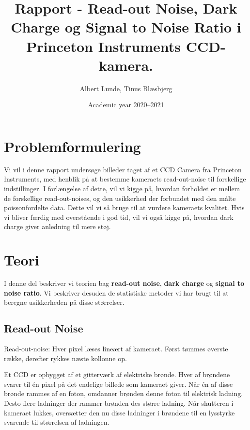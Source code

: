 \documentclass[working]{tuftebook}
\title{Rapport - Read-out Noise, Dark Charge og Signal to Noise Ratio i Princeton Instruments CCD-kamera.}
\author{Albert Lunde, Tinus Blæsbjerg}
\date{Academic year 2020--2021}
\begin{document}
\maketitle
\pagestyle{fancy}
\tableofcontents
\cleardoublepage
\chapter*{Problemformulering}
Vi vil i denne rapport undersøge billeder taget af et CCD Camera fra Princeton Instruments, med henblik på at bestemme kameraets read-out-noise til forskellige indstillinger. I forlængelse af dette, vil vi kigge på, hvordan forholdet er mellem de forskellige read-out-noises, og den usikkerhed der forbundet med den målte poissonfordelte data. Dette vil vi så bruge til at vurdere kameraets kvalitet. Hvis vi bliver færdig med overstående i god tid, vil vi også kigge på, hvordan dark charge giver anledning til mere støj.

\chapter*{Teori}
I denne del beskriver vi teorien bag \textbf{read-out noise}, \textbf{dark charge} og \textbf{signal to noise ratio}. Vi beskriver desuden de statistiske metoder vi har brugt til at beregne usikkerheden på disse størrelser.
\section{Read-out Noise}
\begin{marginfigure}
    \centering
    \caption{Read-out-noise: Hver pixel læses lineært af kameraet. Først tømmes øverste række, derefter rykkes næste kollonne op.}
    \label{fig:read-out-noise}
\end{marginfigure}
Et CCD er opbygget af et gitterværk af elektriske brønde. Hver af brøndene svarer til én pixel på det endelige billede som kameraet giver. Når én af disse brønde rammes af en foton, omdanner brønden denne foton til elektrisk ladning. Desto flere ladninger der rammer brønden des større ladning. Når shutteren i kameraet lukkes, oversætter den nu disse ladninger i brøndene til en lysstyrke svarende til størrelsen af ladningen.
\\
\end{document}
